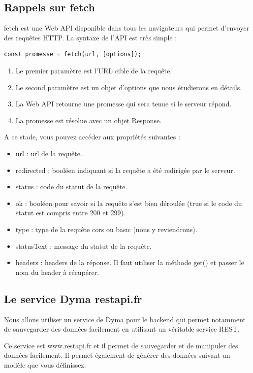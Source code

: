 \documentclass{article}
\begin{document}
\subsection{Rappels sur fetch}
{\color{monOrange}fetch} est une {\color{monOrange}Web API} disponible dans tous les navigateurs qui permet d'envoyer des requêtes {\color{monOrange}HTTP}. La syntaxe de l'{\color{monOrange}API} est très simple :
\begin{verbatim}
const promesse = fetch(url, [options]);
\end{verbatim}
\begin{enumerate}
\item Le premier paramètre est l'URL cible de la requête.
\item Le second paramètre est un objet d'options que nous étudierons en détails.
\item La Web API retourne une promesse qui sera tenue si le serveur répond.
\item La promesse est résolue avec un objet Response.
\end{enumerate}
A ce stade, vous pouvez accéder aux propriétés suivantes :
\begin{itemize}
\item {\color{monOrange}url :} url de la requête.
\item {\color{monOrange}redirected :} booléen indiquant si la requête a été redirigée par le serveur.
\item {\color{monOrange}status :} code du statut de la requête.

\item {\color{monOrange}ok :} booléen pour savoir si la requête s'est bien déroulée (true si le code du statut est compris entre 200 et 299).

\item {\color{monOrange}type :} type de la requête cors ou basic (nous y reviendrons).

\item {\color{monOrange}statusText :} message du statut de la requête.

\item {\color{monOrange}headers :} headers de la réponse. Il faut utiliser la méthode get() et passer le nom du header à récupérer.

\end{itemize}
\subsection{Le service Dyma restapi.fr}
Nous allons utiliser un service de Dyma pour le backend qui permet notamment de sauvegarder des données facilement en utilisant un véritable service REST.

Ce service est {\color{monOrange}www.restapi.fr} et il permet de sauvegarder et de manipuler des données facilement. Il permet également de générer des données suivant un modèle que vous définissez.
\end{document}
